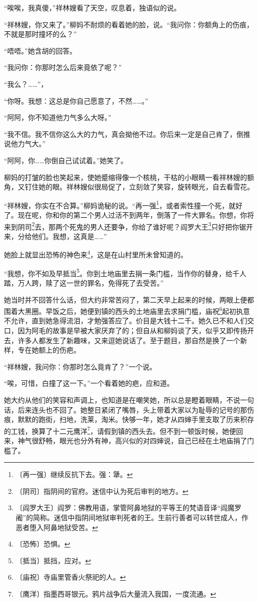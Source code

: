 \documentclass[12pt,UTF-8,openany]{ctexbook}
\begin{document}
\begin{large}
    “唉唉，我真傻，”祥林嫂看了天空，叹息着，独语似的说。
    
    “祥林嫂，你又来了。”柳妈不耐烦的看着她的脸，说。“我问你：你额角上的伤痕，不就是那时撞坏的么？”
    
    “唔唔。”她含胡的回答。
    
    “我问你：你那时怎么后来竟依了呢？”
    
    “我么？……”，
    
    “你呀。我想：这总是你自己愿意了，不然……。”
    
    “阿阿，你不知道他力气多么大呀。”
    
    “我不信。我不信你这么大的力气，真会拗他不过。你后来一定是自己肯了，倒推说他力气大。”
    
    “阿阿，你……你倒自己试试着。”她笑了。
    
    柳妈的打皱的脸也笑起来，使她蹙缩得像一个核桃，干枯的小眼睛一看祥林嫂的额角，又钉住她的眼。祥林嫂似很局促了，立刻敛了笑容，旋转眼光，自去看雪花。
    
    “祥林嫂，你实在不合算。”柳妈诡秘的说。“再一强\footnote{〔再一强〕继续反抗下去。强：犟。}，或者索性撞一个死，就好了。现在呢，你和你的第二个男人过活不到两年，倒落了一件大罪名。你想，你将来到阴司\footnote{〔阴司〕指阴间的官府。迷信中认为死后审判的地方。}去，那两个死鬼的男人还要争，你给了谁好呢？阎罗大王\footnote{〔阎罗大王〕阎罗：佛教用语，掌管阿鼻地狱的平等王的梵语音译“阎魔罗阇”的简称。迷信中指阴间地狱审判死者的王。生前行善者可以转世成人，作恶者堕入阿鼻地狱受苦。}只好把你锯开来，分给他们。我想，这真是……”
    
    她脸上就显出恐怖的神色来\footnote{〔恐怖〕恐惧。}，这是在山村里所未曾知道的。
    
    “我想，你不如及早抵当\footnote{〔抵当〕抵挡，应对。}。你到土地庙里去捐一条门槛，当作你的替身，给千人踏，万人跨，赎了这一世的罪名，免得死了去受苦。”
    
    她当时并不回答什么话，但大约非常苦闷了，第二天早上起来的时候，两眼上便都围着大黑圈。早饭之后，她便到镇的西头的土地庙里去求捐门槛，庙祝\footnote{〔庙祝〕寺庙里管香火祭祀的人。}起初执意不允许，直到她急得流泪，才勉强答应了。价目是大钱十二千。她久已不和人们交口，因为阿毛的故事是早被大家厌弃了的；但自从和柳妈谈了天，似乎又即传扬开去，许多人都发生了新趣味，又来逗她说话了。至于题目，那自然是换了一个新样，专在她额上的伤疤。
    
    “祥林嫂，我问你：你那时怎么竟肯了？”一个说。
    
    “唉，可惜，白撞了这一下。”一个看着她的疤，应和道。
    
    她大约从他们的笑容和声调上，也知道是在嘲笑她，所以总是瞪着眼睛，不说一句话，后来连头也不回了。她整日紧闭了嘴唇，头上带着大家以为耻辱的记号的那伤痕，默默的跑街，扫地，洗莱，淘米。快够一年，她才从四婶手里支取了历来积存的工钱，换算了十二元鹰洋\footnote{〔鹰洋〕指墨西哥银元。鸦片战争后大量流入我国，一度流通。}，请假到镇的西头去。但不到一顿饭时候，她便回来，神气很舒畅，眼光也分外有神，高兴似的对四婶说，自己已经在土地庙捐了门槛了。
    

\end{large}
\end{document}
